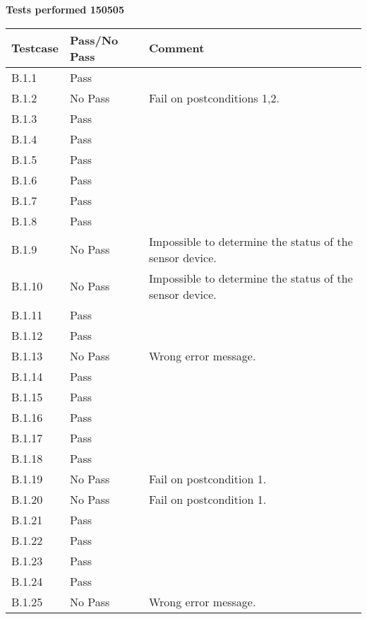 \renewcommand{\testdate}{150505}
\textbf{ Tests performed \testdate}
\begin{center}
  		\begin{tabular}{| p{3cm} | p{5cm} | p{5cm} |}
    		\hline
	    	\textbf{Testcase}			& \textbf{Pass/No Pass} 	& \textbf{Comment} \\ \hline
    		B.1.1		 						& Pass 										&  				\\ \hline
    		B.1.2		 						& No Pass 										& Fail on postconditions 1,2. 				 \\	\hline
    		B.1.3		 						& Pass 										& 				 \\	\hline
    		B.1.4		 						& Pass 										& 				 \\	\hline
    		B.1.5		 						& Pass 										& 				 \\	\hline
    		B.1.6		 						& Pass 										& 				 \\	\hline
    		B.1.7		 						& Pass 										& 				 \\	\hline
    		B.1.8		 						& Pass 										& 				 \\	\hline
    		B.1.9		 						& No Pass 										& Impossible to determine the status of the sensor device. 				 \\	\hline
    		B.1.10	 							& No Pass 										& Impossible to determine the status of the sensor device.				 \\	\hline
    		B.1.11	 							& Pass 										& 				 \\	\hline
    		B.1.12	 							& Pass 										& 				 \\	\hline
    		B.1.13	 							& No Pass 										& Wrong error message.				 \\	\hline
    		B.1.14	 							& Pass 										& 				 \\	\hline
    		B.1.15	 							& Pass 										& 				 \\	\hline
    		B.1.16	 							& Pass 										& 				 \\	\hline
    		B.1.17	 							& Pass 										& 				 \\	\hline
    		B.1.18	 							& Pass 										& 				 \\	\hline
    		B.1.19	 							& No Pass 										& Fail on postcondition 1. 				 \\	\hline
    		B.1.20	 							& No Pass 										& Fail on postcondition 1.				 \\	\hline
    		B.1.21	 							& Pass 										& 				 \\	\hline
    		B.1.22	 							& Pass 										& 				 \\	\hline
    		B.1.23	 							& Pass 										& 				 \\	\hline
    		B.1.24	 							& Pass 										& 				 \\	\hline
    		B.1.25	 							& No Pass 										& Wrong error message.				 \\	\hline
 		 \end{tabular}
	\end{center}